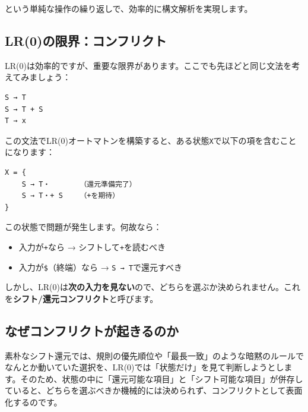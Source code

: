 という単純な操作の繰り返しで、効率的に構文解析を実現します。

\hypertarget{chapter5-lr0ux306eux9650ux754cux30b3ux30f3ux30d5ux30eaux30afux30c8}{%
\subsection{LR(0)の限界：コンフリクト}\label{chapter5-lr0ux306eux9650ux754cux30b3ux30f3ux30d5ux30eaux30afux30c8}}

LR(0)は効率的ですが、重要な限界があります。ここでも先ほどと同じ文法を考えてみましょう：

\begin{verbatim}
S → T
S → T + S
T → x
\end{verbatim}

この文法でLR(0)オートマトンを構築すると、ある状態\texttt{X}で以下の項を含むことになります：

\begin{verbatim}
X = {
    S → T・       （還元準備完了）
    S → T・+ S    （+を期待）
}
\end{verbatim}

この状態で問題が発生します。何故なら：

\begin{itemize}
\tightlist
\item
  入力が\texttt{+}なら → シフトして\texttt{+}を読むべき
\item
  入力が\texttt{\$}（終端）なら → \texttt{S\ →\ T}で還元すべき
\end{itemize}

しかし、LR(0)は\textbf{次の入力を見ない}ので、どちらを選ぶか決められません。これを\textbf{シフト/還元コンフリクト}と呼びます。

\hypertarget{chapter5-ux306aux305cux30b3ux30f3ux30d5ux30eaux30afux30c8ux304cux8d77ux304dux308bux306eux304b}{%
\subsection{なぜコンフリクトが起きるのか}\label{chapter5-ux306aux305cux30b3ux30f3ux30d5ux30eaux30afux30c8ux304cux8d77ux304dux308bux306eux304b}}

素朴なシフト還元では、規則の優先順位や「最長一致」のような暗黙のルールでなんとか動いていた選択を、LR(0)では「状態だけ」を見て判断しようとします。そのため、状態の中に「還元可能な項目」と「シフト可能な項目」が併存していると、どちらを選ぶべきか機械的には決められず、コンフリクトとして表面化するのです。

